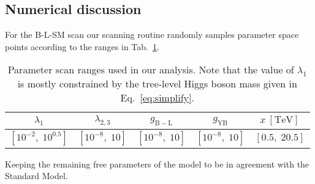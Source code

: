 \subsection{Numerical discussion}

For the B-L-SM scan our scanning routine randomly samples parameter space points according to the ranges in Tab.~\ref{tab:scan}.
%
\begin{table}[H]
	\begin{center}
		\begin{tabular}{ccccc}
			\toprule                     
			$\lambda_{1}$ & $\lambda_{2,3}$ & $g_{\mathrm{B-L}}$ & $g_{\mathrm{YB}}$ & $x~{\mathrm{[TeV]}}$  
			\\       
						\midrule 
			$\left[10^{-2},\; 10^{0.5}
			\right]$ 			    							& $\left[10^{-8},\; 10
			\right]$ 			    							& $\left[10^{-8},\; 10
			\right]$		& $\left[10^{-8},\; 10
			\right]$	&	$\left[0.5,\; 20.5
			\right]$ 	\\
			\bottomrule
		\end{tabular}  
		\caption{Parameter scan ranges used in our analysis. Note that the value of $\lambda_1$ is mostly constrained by the tree-level Higgs boson mass given in Eq.~\eqref{eq:simplify}. 
		}
		\label{tab:scan}
	\end{center}
\end{table}
%  
{ \color{gray} Keeping the remaining free parameters of the model to be in agreement with the Standard Model. } 
%
%
%
%
